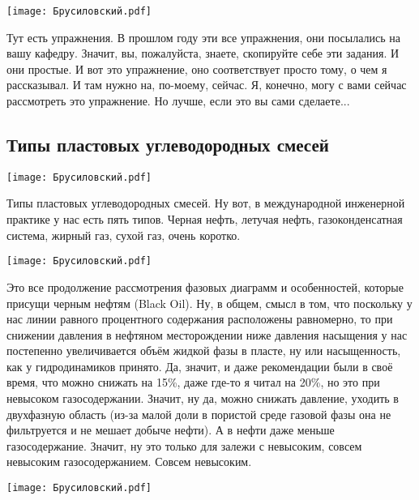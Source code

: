 \documentclass[main.tex]{subfiles}
\begin{document}
\begin{center}
\texttt{[image: Брусиловский.pdf]}
\end{center}

Тут есть упражнения.
В прошлом году эти все упражнения, они посылались на вашу
кафедру.
Значит, вы, пожалуйста, знаете, скопируйте себе эти задания.
И они простые.
И вот это упражнение, оно соответствует просто тому, о чем я рассказывал.
И там нужно на, по-моему, сейчас.
Я, конечно, могу с вами сейчас рассмотреть это упражнение.
Но лучше, если это вы сами сделаете...

\subsection{Типы пластовых углеводородных смесей}

\begin{center}
\texttt{[image: Брусиловский.pdf]}
\end{center}

Типы пластовых углеводородных смесей.
Ну вот, в международной инженерной практике у нас есть пять типов.
Черная нефть, летучая нефть, газоконденсатная система, жирный газ, сухой газ, очень коротко.

\begin{center}
\texttt{[image: Брусиловский.pdf]}
\end{center}

Это все продолжение рассмотрения фазовых диаграмм и особенностей, которые присущи черным нефтям (Black Oil).
Ну, в общем, смысл в том, что поскольку у нас линии равного процентного содержания расположены равномерно, то при снижении давления в нефтяном месторождении ниже давления насыщения у нас постепенно увеличивается объём жидкой фазы в пласте, ну или насыщенность, как у гидродинамиков принято.
Да, значит, и даже рекомендации были в своё время, что можно снижать на 15\%, даже где-то я читал на 20\%, но это при невысоком газосодержании.
Значит, ну да, можно снижать давление, уходить в двухфазную область (из-за малой доли в пористой среде газовой фазы она не фильтруется и не мешает добыче нефти).
А в нефти даже меньше газосодержание.
Значит, ну это только для залежи с невысоким, совсем невысоким газосодержанием.
Совсем невысоким.

\begin{center}
\texttt{[image: Брусиловский.pdf]}
\end{center}
\end{document}
